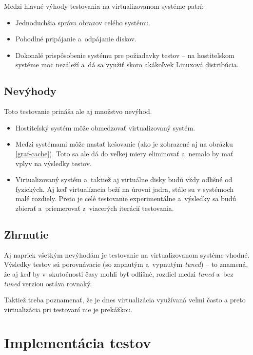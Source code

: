 Medzi hlavné výhody testovania na virtualizovanom systéme patrí:

\begin{itemize}
    \item Jednoduchšia správa obrazov celého systému.
    \item Pohodlné pripájanie a~odpájanie diskov.
    \item Dokonalé prispôsobenie systému pre požiadavky testov -- na
    hostiteľskom systéme moc nezáleží a~dá sa využiť skoro akákoľvek Linuxová
    distribúcia.
\end{itemize}

\subsection{Nevýhody}

Toto testovanie prináša ale aj množstvo nevýhod. 

\begin{itemize}
    \item Hostiteľský systém môže obmedzovať virtualizovaný systém.
    \item Medzi systémami môže nastať kešovanie (ako je zobrazené aj na obrázku
    \ref{graf-cache}). Toto sa ale dá do veľkej miery eliminovať a~nemalo by
    mať vplyv na výsledky testov.
    \item Virtualizovaný systém a~taktiež aj virtuálne disky budú vždy odlišné
    od fyzických. Aj keď virtualízacia beží na úrovni jadra, stále su v
    systémoch malé rozdiely. Preto je celé testovanie experimentálne a~výsledky
    sa budú zbierať a~priemerovať z~viacerých iterácií testovania.
\end{itemize}

\subsection{Zhrnutie}

Aj napriek všetkým nevýhodám je testovanie na virtualizovanom systéme vhodné.
Výsledky testov sú porovnávacie (so zapnutým a~vypnutým \emph{tuned}) -- to
znamená, že aj keď by v~skutočnosti časy mohli byť odlišné, rozdiel medzi
\emph{tuned} a~bez \emph{tuned} verziou ostáva rovnaký.

Taktiež treba poznamenať, že je dnes virtualizácia využívaná veľmi často a
preto virtualizácia pri testovaní nie je prekážkou.

%
%

\section{Implementácia testov}

